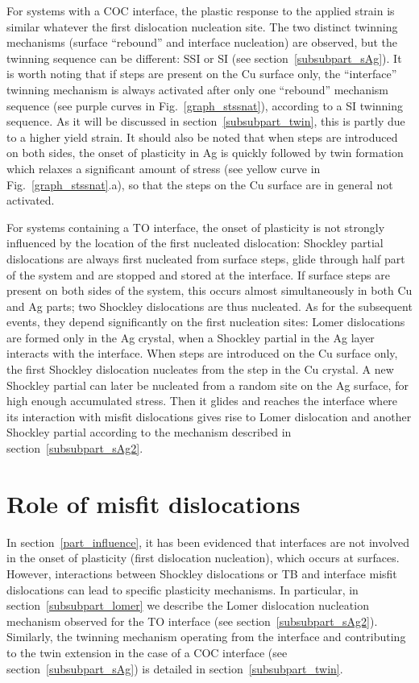 \documentclass[final,3p,times,twocolumn]{elsarticle}
\begin{document}
For systems with a COC interface, the plastic response to the applied strain is similar whatever the first dislocation nucleation site. The two distinct twinning mechanisms (surface ``rebound'' and interface nucleation) are observed, but the twinning sequence can be different: SSI or SI (see section~\ref{subsubpart_sAg}). It is worth noting that if steps are present on the Cu surface only, the ``interface'' twinning mechanism is always activated after only one ``rebound'' mechanism sequence (see purple curves in Fig.~\ref{graph_stssnat}), according to a SI twinning sequence. As it will be discussed in section~\ref{subsubpart_twin}, this is partly due to a higher yield strain. It should also be noted that when steps are introduced on both sides, the onset of plasticity in Ag is quickly followed by twin formation which relaxes a significant amount of stress (see yellow curve in Fig.~\ref{graph_stssnat}.a), so that the steps on the Cu surface are in general not activated.

For systems containing a TO interface, the onset of plasticity is not strongly influenced by the location of the first nucleated dislocation: Shockley partial dislocations are always first nucleated from surface steps, glide through half part of the system and are stopped and stored at the interface. If surface steps are present on both sides of the system, this occurs almost simultaneously in both Cu and Ag parts; two Shockley dislocations are thus nucleated.
As for the subsequent events, they depend significantly on the first nucleation sites: Lomer dislocations are formed only in the Ag crystal, when a Shockley partial in the Ag layer interacts with the interface. When steps are introduced on the Cu surface only, the first Shockley dislocation nucleates from the step in the Cu crystal. A new Shockley partial can later be nucleated from a random site on the Ag surface, for high enough accumulated stress. Then it glides and reaches the interface where its interaction with misfit dislocations gives rise to Lomer dislocation and another Shockley partial according to the mechanism described in section~\ref{subsubpart_sAg2}.
 
\section{Role of misfit dislocations}
\label{part_misfit}

In section~\ref{part_influence}, it has been evidenced that interfaces are not involved in the onset of plasticity (first dislocation nucleation), which occurs at surfaces. However, interactions between Shockley dislocations or TB and interface misfit dislocations can lead to specific plasticity mechanisms. In particular, in section~\ref{subsubpart_lomer} we describe the Lomer dislocation nucleation mechanism observed for the TO interface (see section~\ref{subsubpart_sAg2}). Similarly, the twinning mechanism operating from the interface and contributing to the twin extension in the case of a COC interface (see section~\ref{subsubpart_sAg}) is detailed in section~\ref{subsubpart_twin}.  
\end{document}
